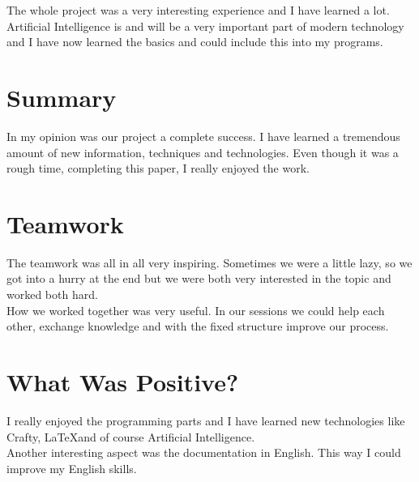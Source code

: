 %
%
%
%

\def\Title{Reflection}
\def\Author{Nicolas Ganz}
\def\Date{\today}







\maketitle %

The whole project was a very interesting experience and I have learned a lot. Artificial Intelligence is and will be a very important part of modern technology and I have now learned the basics and could include this into my programs.

\section*{Summary}
In my opinion was our project a complete success. I have learned a tremendous amount of new information, techniques and technologies. Even though it was a rough time, completing this paper, I really enjoyed the work.

\section*{Teamwork}
The teamwork was all in all very inspiring. Sometimes we were a little lazy, so we got into a hurry at the end but we were both very interested in the topic and worked both hard.\medskip\\
How we worked together was very useful. In our sessions we could help each other, exchange knowledge and with the fixed structure improve our process.

\section*{What Was Positive?}
I really enjoyed the programming parts and I have learned new technologies like Crafty, \LaTeX and of course Artificial Intelligence.\medskip\\
Another interesting aspect was the documentation in English. This way I could improve my English skills.

